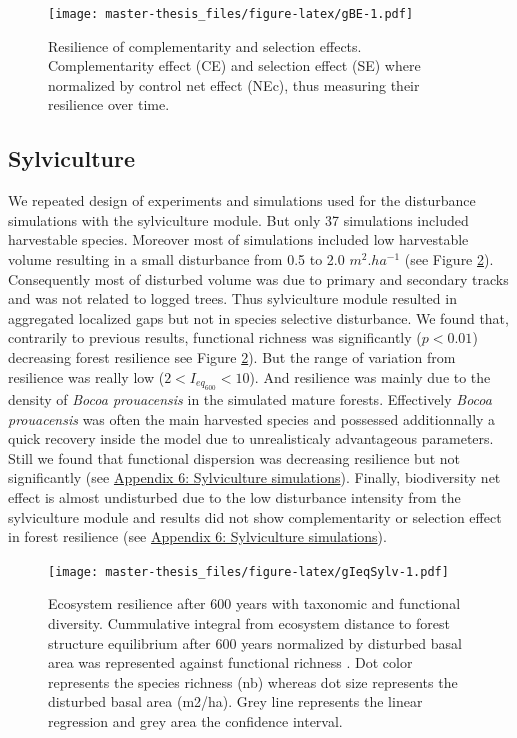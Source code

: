 \documentclass[12pt,]{article}
\theoremstyle{definition}
\theoremstyle{definition}
\theoremstyle{remark}
\begin{document}
\begin{figure}[htbp]
\centering
\texttt{[image: master-thesis\_files/figure-latex/gBE-1.pdf]}
\caption{\label{fig:gBE}Resilience of complementarity and selection effects.
Complementarity effect (CE) and selection effect (SE) where normalized
by control net effect (NEc), thus measuring their resilience over time.}
\end{figure}

\subsection{Sylviculture}\label{sylviculture-1}

We repeated design of experiments and simulations used for the
disturbance simulations with the sylviculture module. But only 37
simulations included harvestable species. Moreover most of simulations
included low harvestable volume resulting in a small disturbance from
0.5 to 2.0 \(m^2.ha^{-1}\) (see Figure \ref{fig:gIeqSylv}). Consequently
most of disturbed volume was due to primary and secondary tracks and was
not related to logged trees. Thus sylviculture module resulted in
aggregated localized gaps but not in species selective disturbance. We
found that, contrarily to previous results, functional richness was
significantly (\(p<0.01\)) decreasing forest resilience see Figure
\ref{fig:gIeqSylv}). But the range of variation from resilience was
really low (\(2 < I_{eq_{600}} < 10\)). And resilience was mainly due to
the density of \emph{Bocoa prouacensis} in the simulated mature forests.
Effectively \emph{Bocoa prouacensis} was often the main harvested
species and possessed additionnally a quick recovery inside the model
due to unrealisticaly advantageous parameters. Still we found that
functional dispersion was decreasing resilience but not significantly
(see \protect\hyperlink{appendix-6-sylviculture-simulations}{Appendix 6:
Sylviculture simulations}). Finally, biodiversity net effect is almost
undisturbed due to the low disturbance intensity from the sylviculture
module and results did not show complementarity or selection effect in
forest resilience (see
\protect\hyperlink{appendix-6-sylviculture-simulations}{Appendix 6:
Sylviculture simulations}).

\begin{figure}[htbp]
\centering
\texttt{[image: master-thesis\_files/figure-latex/gIeqSylv-1.pdf]}
\caption{\label{fig:gIeqSylv}Ecosystem resilience after 600 years with
taxonomic and functional diversity. Cummulative integral from ecosystem
distance to forest structure equilibrium after 600 years normalized by
disturbed basal area was represented against functional richness
\citep[FRic,][]{villeger_new_2008}. Dot color represents the species
richness (nb) whereas dot size represents the disturbed basal area
(m2/ha). Grey line represents the linear regression and grey area the
confidence interval.}
\end{figure}
\end{document}
